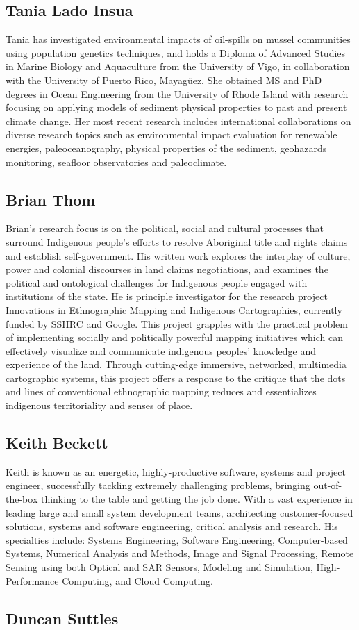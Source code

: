 \subsection*{Tania Lado Insua}

Tania has investigated environmental impacts of oil-spills on mussel
communities using population genetics techniques, and holds a Diploma
of Advanced Studies in Marine Biology and Aquaculture from the
University of Vigo, in collaboration with the University of Puerto
Rico, Mayagüez.  She obtained MS and PhD degrees in Ocean Engineering
from the University of Rhode Island with research focusing on applying
models of sediment physical properties to past and present climate
change. Her most recent research includes international collaborations
on diverse research topics such as environmental impact evaluation for
renewable energies, paleoceanography, physical properties of the
sediment, geohazards monitoring, seafloor observatories and
paleoclimate.


\subsection*{Brian Thom}

Brian’s research focus is on the political, social and cultural
processes that surround Indigenous people's efforts to resolve
Aboriginal title and rights claims and establish self-government.  His
written work explores the interplay of culture, power and colonial
discourses in land claims negotiations, and examines the political and
ontological challenges for Indigenous people engaged with institutions
of the state.  He is principle investigator for the research project
Innovations in Ethnographic Mapping and Indigenous Cartographies,
currently funded by SSHRC and Google. This project grapples with the
practical problem of implementing socially and politically powerful
mapping initiatives which can effectively visualize and communicate
indigenous peoples’ knowledge and experience of the land. Through
cutting-edge immersive, networked, multimedia cartographic systems,
this project offers a response to the critique that the dots and lines
of conventional ethnographic mapping reduces and essentializes
indigenous territoriality and senses of place.


\subsection*{Keith Beckett}

Keith is known as an energetic, highly-productive software, systems
and project engineer, successfully tackling extremely challenging
problems, bringing out-of-the-box thinking to the table and getting
the job done. With a vast experience in leading large and small system
development teams, architecting customer-focused solutions, systems
and software engineering, critical analysis and research.  His
specialties include: Systems Engineering, Software Engineering,
Computer-based Systems, Numerical Analysis and Methods, Image and
Signal Processing, Remote Sensing using both Optical and SAR Sensors,
Modeling and Simulation, High-Performance Computing, and Cloud
Computing.

\subsection*{Duncan Suttles}
